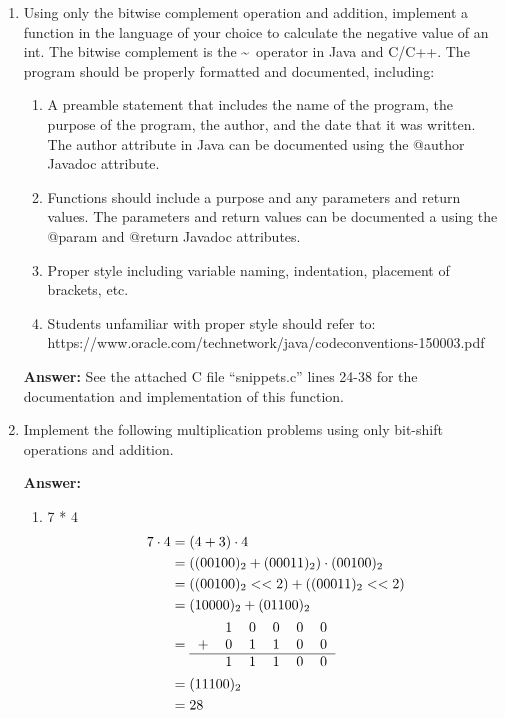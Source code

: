 \documentclass[12pt]{article}
\begin{document}
\begin{enumerate}
\begin{enumerate}
    \end{enumerate}

    \item Using only the bitwise complement operation and addition, implement a function in the language of your choice to calculate the negative value of an int. The bitwise complement is the \textasciitilde \ operator in Java and C/C++. The program should be properly formatted and documented, including:
    \begin{enumerate}
      \item A preamble statement that includes the name of the program, the purpose of the program, the author, and the date that it was written. The author attribute in Java can be documented using the @author Javadoc attribute.
      \item Functions should include a purpose and any parameters and return values. The parameters and return values can be documented a using the @param and @return Javadoc attributes.
      \item Proper style including variable naming, indentation, placement of brackets, etc.
      \item Students unfamiliar with proper style should refer to: \newline https://www.oracle.com/technetwork/java/codeconventions-150003.pdf
    \end{enumerate}

    \textbf{Answer:}
    See the attached C file ``snippets.c'' lines 24-38 for the documentation and implementation of this function.

    \item Implement the following multiplication problems using only bit-shift operations and addition.

    \textbf{Answer:}
    \begin{enumerate}
      \item 7 * 4
      \begin{align*}
        7 \cdot 4 &= (4 + 3) \cdot 4 \\
        &= ((00100)_2 + (00011)_2) \cdot (00100)_2 \\
        &= ((00100)_2 << 2) + ((00011)_2 << 2) \\
        &= (10000)_2 + (01100)_2 \\
        &= \begin{tabular}{cccccc}
          & 1 & 0 & 0 & 0 & 0\\
        + & 0 & 1 & 1 & 0 & 0 \\
        \hline
          & 1 & 1 & 1 & 0 & 0 \\
        \end{tabular} \\
        &= (11100)_2 \\
        &= 28
      \end{align*}


\end{enumerate}
\end{enumerate}
\end{document}
